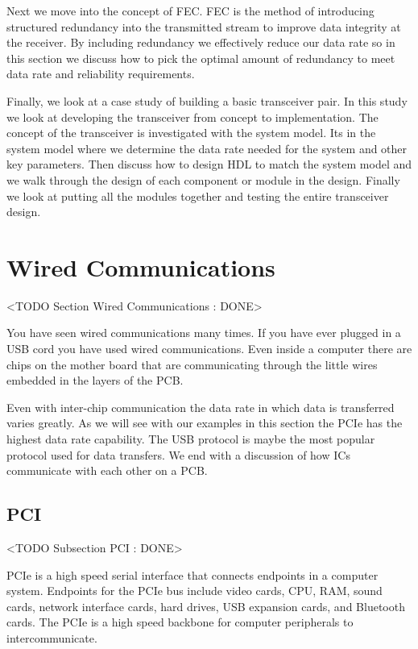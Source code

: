 Next we move into the concept of \ac{FEC}. \ac{FEC} is the method of introducing structured redundancy into the transmitted stream to improve data integrity at the receiver. By including redundancy we effectively reduce our data rate so in this section we discuss how to pick the optimal amount of redundancy to meet data rate and reliability requirements.

Finally, we look at a case study of building a basic transceiver pair. In this study we look at developing the transceiver from concept to implementation. The concept of the transceiver is investigated with the system model. Its in the system model where we determine the data rate needed for the system and other key parameters. Then discuss how to design \ac{HDL} to match the system model and we walk through the design of each component or module in the design. Finally we look at putting all the modules together and testing the entire transceiver design. 

\section{Wired Communications}
	<TODO Section Wired Communications : DONE>

You have seen wired communications many times. If you have ever plugged in a \ac{USB} cord you have used wired communications. Even inside a computer there are chips on the mother board that are communicating through the little wires embedded in the layers of the \ac{PCB}.	
	
Even with inter-chip communication the data rate in which data is transferred varies greatly. As we will see with our examples in this section the \ac{PCIe} has the highest data rate capability. The \ac{USB} protocol is maybe the most popular protocol used for data transfers. We end with a discussion of how \ac{IC}s communicate with each other on a \ac{PCB}.
	
\subsection{PCI}
	<TODO Subsection PCI : DONE>

\ac{PCIe} is a high speed serial interface that connects endpoints in a computer system. Endpoints for the \ac{PCIe} bus include video cards, \ac{CPU}, \ac{RAM}, sound cards, network interface cards, hard drives, \ac{USB} expansion cards, and Bluetooth cards. The \ac{PCIe} is a high speed backbone for computer peripherals to intercommunicate. \cite{pcieref}	
	
